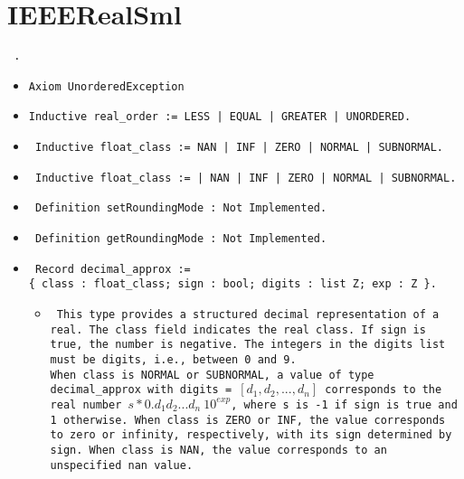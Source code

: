 \documentclass[11pt]{report}
\begin{document}
\section*{IEEERealSml}

\begin{coqdoccode}
\coqdocemptyline
\coqdocnoindent
\texttt{  .\coqdoceol}
\coqdocemptyline
\end{coqdoccode}

\begin{itemize}
\item  \texttt{Axiom UnorderedException}



\item  \texttt{Inductive real\_order := LESS | EQUAL | GREATER | UNORDERED.}



\item \texttt{ Inductive float\_class := 
        NAN
      | INF
      | ZERO
      | NORMAL
      | SUBNORMAL. }



\item \texttt{ Inductive float\_class := 
      | NAN
      | INF
      | ZERO
      | NORMAL
      | SUBNORMAL.}



\item  \texttt{ Definition setRoundingMode : Not Implemented.}



\item  \texttt{ Definition getRoundingMode : Not Implemented.}



\item  \texttt{ Record decimal\_approx :=\\ \{
                                class : float\_class;
                                sign : bool;
                                digits : list Z;
                                exp : Z
                              \}.}

\begin{itemize}
\item  \begin{flushleft} \texttt{ 
This type provides a structured decimal representation of a real. The class field indicates the real class. If sign is true, the number is negative. The integers in the digits list must be digits, i.e., between 0 and 9.\\
When class is NORMAL or SUBNORMAL, a value of type decimal\_approx with 
digits = $[d_1, d_2, ..., d_n]$ corresponds to the real number $s * 0.d_1 d_2 ... d_n \ 10^{exp}$, where s is -1 if sign is true and 1 otherwise. When class is ZERO or INF, the value corresponds to zero or infinity, respectively, with its sign determined by sign. When class is NAN, the value corresponds to an unspecified nan value. } \end{flushleft} 




\end{itemize}
\end{itemize}
\end{document}
